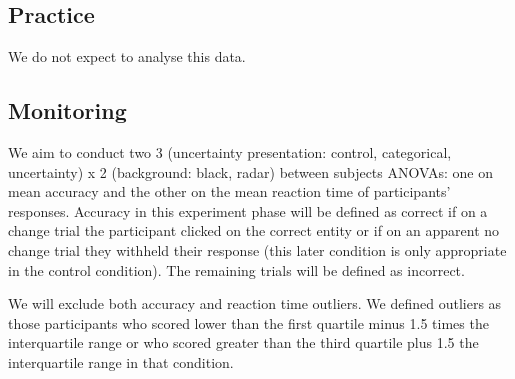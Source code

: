 \documentclass[doc, a4paper, apacite]{apa6}
\begin{document}
\subsection{Practice}
We do not expect to analyse this data. 

\subsection{Monitoring}
We aim to conduct two 3 (uncertainty presentation: control, categorical, uncertainty) x 2 (background: black, radar) between subjects ANOVAs: one on mean accuracy and the other on the mean reaction time of participants' responses. 
Accuracy in this experiment phase will be defined as correct if on a change trial the participant clicked on the correct entity or if on an apparent no change trial they withheld their response (this later condition is only appropriate in the control condition). 
The remaining trials will be defined as incorrect. 

We will exclude both accuracy and reaction time outliers. 
We defined outliers as those participants who scored lower than the first quartile minus 1.5 times the interquartile range or who scored greater than the third quartile plus 1.5 the interquartile range in that condition. 




\clearpage
\newpage


\end{document}
